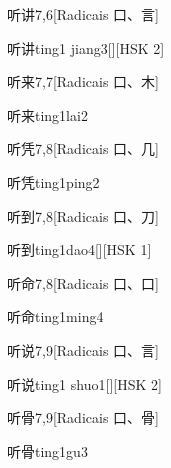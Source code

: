 \begin{entry}{听讲}{7,6}[Radicais ⼝、⾔]
  \begin{phonetics}{听讲}{ting1 jiang3}[][HSK 2]
  \end{phonetics}
\end{entry}

\begin{entry}{听来}{7,7}[Radicais ⼝、⽊]
  \begin{phonetics}{听来}{ting1lai2}
  \end{phonetics}
\end{entry}

\begin{entry}{听凭}{7,8}[Radicais ⼝、⼏]
  \begin{phonetics}{听凭}{ting1ping2}
  \end{phonetics}
\end{entry}

\begin{entry}{听到}{7,8}[Radicais ⼝、⼑]
  \begin{phonetics}{听到}{ting1dao4}[][HSK 1]
  \end{phonetics}
\end{entry}

\begin{entry}{听命}{7,8}[Radicais ⼝、⼝]
  \begin{phonetics}{听命}{ting1ming4}
  \end{phonetics}
\end{entry}

\begin{entry}{听说}{7,9}[Radicais ⼝、⾔]
  \begin{phonetics}{听说}{ting1 shuo1}[][HSK 2]
  \end{phonetics}
\end{entry}

\begin{entry}{听骨}{7,9}[Radicais ⼝、⾻]
  \begin{phonetics}{听骨}{ting1gu3}
  \end{phonetics}
\end{entry}

